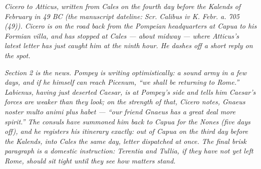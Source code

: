 
\textit{Cicero to Atticus, written from Cales on the
fourth day before the Kalends of February in 49 BC (the
manuscript dateline: \textit{Scr. Calibus iv K. Febr.
a. 705 (49)}). Cicero is on the road back from the
Pompeian headquarters at Capua to his Formian villa, and
has stopped at Cales --- about midway --- where Atticus's
latest letter has just caught him at the ninth hour. He
dashes off a short reply on the spot.}

\textit{Section 2 is the news. Pompey is writing
optimistically: a sound army in a few days, and if he
himself can reach Picenum, ``we shall be returning to
Rome.'' Labienus, having just deserted Caesar, is at
Pompey's side and tells him Caesar's forces are weaker
than they look; on the strength of that, Cicero notes,
\emph{Gnaeus noster multo animi plus habet} --- ``our
friend Gnaeus has a great deal more spirit.'' The
consuls have summoned him back to Capua for the Nones
(five days off), and he registers his itinerary
exactly: out of Capua on the third day before the
Kalends, into Cales the same day, letter dispatched at
once. The final brisk paragraph is a domestic
instruction: Terentia and Tullia, if they have not yet
left Rome, should sit tight until they see how matters
stand.}
